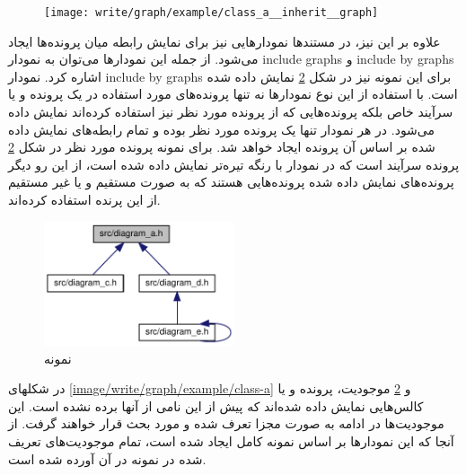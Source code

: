 \begin{figure}
    \centering
    \texttt{[image: write/graph/example/class\_a\_\_inherit\_\_graph]}
    \label{image/write/graph/example/class_a__inherit__graph}
\end{figure}

علاوه بر این نیز، در مستندها نمودارهایی نیز برای نمایش رابطه میان پرونده‌ها
ایجاد می‌شود. از جمله این نمودارها می‌توان به نمودار \glspl{include graph} و
\glspl{include by graph} اشاره کرد. نمودار \glspl{include by graph} برای این
نمونه نیز در شکل \ref{image/write/graph/example/diagram__a_8h__dep__incl} نمایش
داده شده است. با استفاده از این نوع نمودارها نه تنها پرونده‌های مورد استفاده در
یک پرونده و یا سرآیند خاص بلکه پرونده‌هایی که از پرونده مورد نظر نیز استفاده
کرده‌اند نمایش داده می‌شود. در هر نمودار تنها یک پرونده مورد نظر بوده و تمام
رابطه‌های نمایش داده شده بر اساس آن پرونده ایجاد خواهد شد. برای نمونه پرونده
مورد نظر در شکل \ref{image/write/graph/example/diagram__a_8h__dep__incl} پرونده
سرآیند  است که در نمودار با رنگه تیره‌تر نمایش داده شده است، از
این رو دیگر پرونده‌های نمایش داده شده پرونده‌هایی هستند که به صورت مستقیم و یا
غیر مستقیم از این پرنده استفاده کرده‌اند.

\begin{figure}
	\centering
	\includegraphics[width=0.5\textwidth]{image/write/graph/example/diagram__a_8h__dep__incl}
	\caption[نمونه]{
		نمونه
	}
	\label{image/write/graph/example/diagram__a_8h__dep__incl}
\end{figure}

\begin{note}
در شکلهای \ref{image/write/graph/example/class-a} و
\ref{image/write/graph/example/diagram__a_8h__dep__incl}
موجودیت، پرونده و یا کالس‌هایی نمایش داده شده‌اند که پیش از این نامی از آنها
برده نشده است. این موجودیت‌ها در ادامه به صورت مجزا تعرف شده و مورد بحث قرار
خواهند گرفت. از آنجا که این نمودارها بر اساس نمونه کامل ایجاد شده است، تمام
موجودیت‌های تعریف شده در نمونه در آن آورده شده است.
\end{note}

